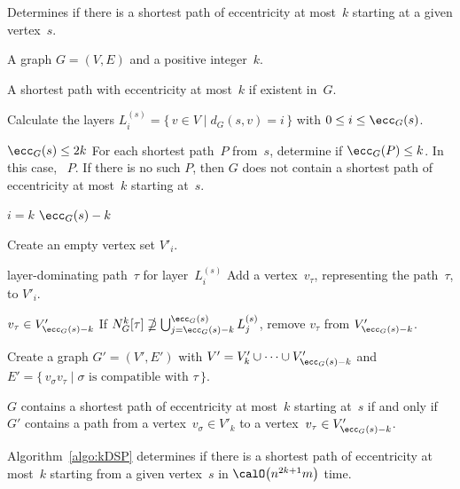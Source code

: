 \begin{algorithm}
    [htb]
    \caption
    {
        \label{algo:kDSP}
        Determines if there is a shortest path of eccentricity at most~$k$ starting at a given vertex~$s$.
    }
\KwIn
{%
    A graph $G = (V, E)$ and a positive integer~$k$.
}

\KwOut
{%
    A shortest path with eccentricity at most~$k$ if existent in~$G$.
}

Calculate the layers $L_i^{(s)}=\{ \, v \in V \mid d_G(s,v) = i \, \}$ with $0 \leq i \leq \ecc_G(s)$.

\If
{%
    $\ecc_G(s) \leq 2k$
}
{
    For each shortest path~$P$ from~$s$, determine if $\ecc_G(P) \leq k$.
    In this case, \Return~$P$.
    If there is no such $P$, then $G$ does not contain a shortest path of eccentricity at most~$k$ starting at~$s$.
    \label{line:kDSP_smallEcc}
}

\For
{%
    $i = k$ \KwTo $\ecc_G(s) - k$%
    \label{line:kDSP_kDomTupleLoopStart}
}
{
    Create an empty vertex set $V'_i$.

    \ForEach
    {
        layer-dominating path~$\tau$ for layer~$L_{i}^{(s)}$
    }
    {
        Add a vertex~$v_\tau$, representing the path~$\tau$, to $V'_i$.
        \label{line:kDSP_kDomTupleLoopEnd}
    }
}
\ForEach
{%
    $v_\tau \in V'_{\ecc_G(s) - k}$
}
{
    If $N_G^k[\tau] \nsupseteq \bigcup_{j=\ecc_G(s)-k}^{\ecc_G(s)} L_j^{(s)}$, remove $v_\tau$ from $V'_{\ecc_G(s) - k}$.
    \label{line:kDSP_removePrimeVertices}
}

Create a graph $G' = (V', E')$ with $V' = V'_k \cup \cdots \cup V'_{\ecc_G(s) - k}$ and $E' = \{ \, v_\sigma v_\tau \mid \text{$\sigma$ is compatible with $\tau$} \, \}$.
\label{line:kDSP_createEprime}

$G$ contains a shortest path of eccentricity at most~$k$ starting at~$s$ if and only if $G'$ contains a path from a vertex~$v_\sigma \in V'_k$ to a vertex~$v_\tau \in V'_{\ecc_G(s) - k}$.
\label{line:kDSP_searchGprime}
\end{algorithm}

\begin{theorem}
    \label{theo:optMespAlgo}
Algorithm~\ref{algo:kDSP} determines if there is a shortest path of eccentricity at most~\( k \) starting from a given vertex~\( s \) in \( \calO \big( n^{2k+1} m \big) \) time.
\end{theorem}

